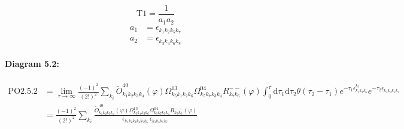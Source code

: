 \documentclass[10pt,a4paper]{article}
\begin{document}
\begin{equation}
\text{T}1 = \frac{1}{a_1a_2}\end{equation}
\begin{align*}
a_1 &= \epsilon^{}_{k_{1}k_{2}k_{5}k_{7}}\\
a_2 &= \epsilon^{}_{k_{3}k_{4}k_{6}k_{8}}
\end{align*}
\paragraph{Diagram 5.2:}
\begin{align}
\text{PO}2.5.2
&= \lim\limits_{\tau \to \infty}\frac{(-1)^2 }{(2!)^2}\sum_{k_i}\tilde{O}^{40}_{k_{1}k_{2}k_{3}k_{4}} (\varphi) \Omega^{13}_{k_{5}k_{1}k_{2}k_{6}} \Omega^{04}_{k_{5}k_{7}k_{3}k_{4}} R^{--}_{k_{7}k_{6}}(\varphi)\int_{0}^{\tau}\mathrm{d}\tau_1\mathrm{d}\tau_2\theta(\tau_2-\tau_1) e^{-\tau_1 \epsilon^{k_{5}}_{k_{1}k_{2}k_{6}}}e^{-\tau_2 \epsilon^{}_{k_{3}k_{4}k_{5}k_{7}}}
 \nonumber \\
&= \frac{(-1)^2 }{(2!)^2}\sum_{k_i}\frac{\tilde{O}^{40}_{k_{1}k_{2}k_{3}k_{4}} (\varphi) \Omega^{13}_{k_{5}k_{1}k_{2}k_{6}} \Omega^{04}_{k_{5}k_{7}k_{3}k_{4}} R^{--}_{k_{7}k_{6}}(\varphi)}{\epsilon^{}_{k_{1}k_{2}k_{3}k_{4}k_{7}k_{6}}\ \epsilon^{}_{k_{3}k_{4}k_{5}k_{7}}\ } 
\end{align}
\end{document}
